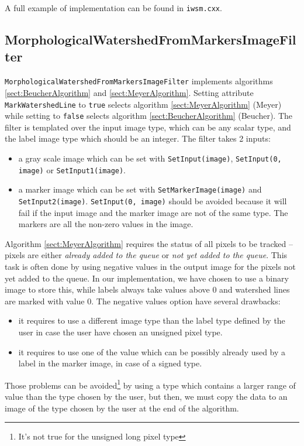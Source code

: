 \documentclass{InsightArticle}
\begin{document}
A full example of implementation can be found in \verb$iwsm.cxx$.


  \subsection{MorphologicalWatershedFromMarkersImageFilter}

\verb$MorphologicalWatershedFromMarkersImageFilter$ implements
algorithms \ref{sect:BeucherAlgorithm} and \ref{sect:MeyerAlgorithm}.
Setting attribute \verb$MarkWatershedLine$ to \verb$true$ selects
algorithm \ref{sect:MeyerAlgorithm} (Meyer) while setting to
\verb$false$ selects algorithm \ref{sect:BeucherAlgorithm} (Beucher).
The filter is templated over the input image type, which can be any
scalar type, and the label image type which should be an integer. The
filter takes 2 inputs:
\begin{itemize}
  \item a gray scale image which can be set with \verb$SetInput(image)$,
\verb$SetInput(0, image)$ or \verb$SetInput1(image)$.
  \item a marker image which can be set with \verb$SetMarkerImage(image)$
and \verb$SetInput2(image)$. \verb$SetInput(0, image)$ should be avoided
because it will fail if the input image and the marker image are not of the
same type. The markers are all the non-zero values in the image.
\end{itemize}

Algorithm \ref{sect:MeyerAlgorithm} requires the status of all pixels
to be tracked -- pixels are either {\em already added to the queue} or
{\em not yet added to the queue}.  This task is often done by using
negative values in the output image for the pixels not yet added to
the queue. In our implementation, we have chosen to use a binary image
to store this, while labels always take values above 0 and watershed
lines are marked with value 0. The negative values option have several
drawbacks:
\begin{itemize}
  \item it requires to use a different image type than the label type defined
by the user in case the user have chosen an unsigned pixel type.
  \item it requires to use one of the value which can be possibly already used
by a label in the marker image, in case of a signed type.
\end{itemize}
Those problems can be avoided\footnote{It's not true for the unsigned long
pixel type} by using a type which contains a larger range of value than the
type chosen by the user, but then, we must copy the data to an image of
the type chosen by the user at the end of the algorithm.
\end{document}
